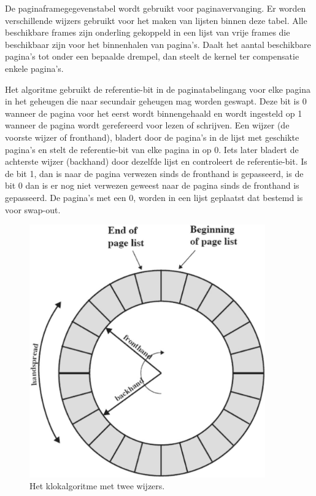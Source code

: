 De paginaframegegevenstabel wordt gebruikt voor paginavervanging. Er worden verschillende wijzers gebruikt voor het maken van lijsten binnen deze tabel. Alle beschikbare frames zijn onderling gekoppeld in een lijst van vrije frames die beschikbaar zijn voor het binnenhalen van pagina’s. Daalt het aantal beschikbare pagina’s tot onder een bepaalde drempel, dan steelt de kernel ter compensatie enkele pagina’s.

Het algoritme gebruikt de referentie-bit in de paginatabelingang voor elke pagina in het geheugen die naar secundair geheugen mag worden geswapt. Deze bit is 0 wanneer de pagina voor het eerst wordt binnengehaald en wordt ingesteld op 1 wanneer de pagina wordt gerefereerd voor lezen of schrijven. Een wijzer (de voorste wijzer of fronthand), bladert door de pagina’s in de lijst met geschikte pagina’s en stelt de referentie-bit van elke pagina in op 0. Iets later bladert de achterste wijzer (backhand) door dezelfde lijst en controleert de referentie-bit. Is de bit 1, dan is naar de pagina verwezen sinds de fronthand is gepasseerd, is de bit 0 dan is er nog niet verwezen geweest naar de pagina sinds de fronthand is gepasseerd. De pagina’s met een 0, worden in een lijst geplaatst dat bestemd is voor swap-out.

\begin{figure}[htp]
    \centering
            \includegraphics[width=4in]{img/klokalgoritme}
        \caption{Het klokalgoritme met twee wijzers.}
    \label{fig:Het klokalgoritme met twee wijzers.}
\end{figure}



